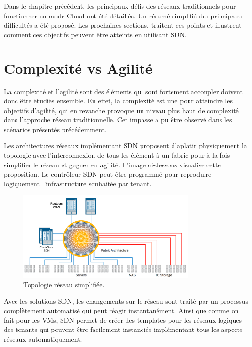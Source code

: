 Dans le chapitre précédent, les principaux défis des réseaux traditionnels pour fonctionner en mode Cloud ont été détaillés. Un résumé simplifié des principales difficultés a été proposé. Les prochaines sections, traitent ces points et illustrent comment ces objectifs peuvent être atteints en utilisant SDN.


\section{Complexité vs Agilité}

La complexité et l'agilité sont des éléments qui sont fortement accoupler doivent donc être étudiés ensemble. En effet, la complexité est une pour atteindre les objectifs d'agilité, qui en revanche provoque un niveau plus haut de complexité dans l'approche réseau traditionnelle. Cet impasse a pu être observé dans les scénarios présentés précédemment. 

Les architectures réseaux implémentant SDN proposent d'aplatir physiquement la topologie avec l'interconnexion de tous les élément à un \gls{fabric} pour à la fois simplifier le réseau et gagner en agilité. L'image ci-dessous visualise cette proposition. Le contrôleur SDN peut être programmé pour reproduire logiquement l'infrastructure souhaitée par tenant. 

\begin{figure}[h]
\begin{center}
\includegraphics[width=0.8\textwidth]{images/RefArchiSDN} 
\caption{Topologie réseau simplifiée. \cite{cloudReadyNetworkJuniper}} \label{RefArchiSDN}
\end{center}
\end{figure} 

Avec les solutions SDN, les changements sur le réseau sont traité par un processus complètement automatisé qui peut réagir instantanément. Ainsi que comme on fait pour les VMs, SDN permet de créer des templates pour les réseaux logiques des tenants qui peuvent être facilement instanciés implémentant tous les aspects réseaux automatiquement. 

